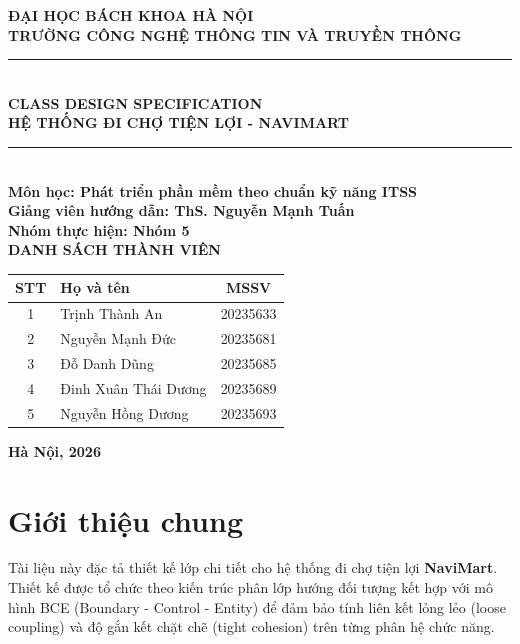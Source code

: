 \documentclass[12pt,a4paper]{article}
\begin{document}
\begin{titlepage}
    \begin{center}
        \textbf{\Large ĐẠI HỌC BÁCH KHOA HÀ NỘI} \\
        \textbf{\Large TRƯỜNG CÔNG NGHỆ THÔNG TIN VÀ TRUYỀN THÔNG} \\
        \vskip 3cm
        \noindent\rule{\textwidth}{2pt} \\
        \vskip 0.6cm
        \textbf{\Huge CLASS DESIGN SPECIFICATION} \\[0.5em]
        \textbf{\huge HỆ THỐNG ĐI CHỢ TIỆN LỢI - NAVIMART} \\
        \noindent\rule{\textwidth}{2pt} \\
        \vskip 1.5cm
        \textbf{\large Môn học: Phát triển phần mềm theo chuẩn kỹ năng ITSS} \\
        \textbf{\large Giảng viên hướng dẫn: ThS. Nguyễn Mạnh Tuấn} \\
        \textbf{\large Nhóm thực hiện: Nhóm 5} \\
        \vskip 1.5cm
        \textbf{\large DANH SÁCH THÀNH VIÊN} \\
        \vskip 0.4cm
        \begin{tabular}{|c|l|c|}
            \hline
            \textbf{STT} & \textbf{Họ và tên} & \textbf{MSSV} \\
            \hline
            1 & Trịnh Thành An & 20235633 \\
            \hline
            2 & Nguyễn Mạnh Đức & 20235681 \\
            \hline
            3 & Đỗ Danh Dũng & 20235685 \\
            \hline
            4 & Đinh Xuân Thái Dương & 20235689 \\
            \hline
            5 & Nguyễn Hồng Dương & 20235693 \\
            \hline
        \end{tabular}
        \vfill
        \textbf{Hà Nội, 2026}
    \end{center}
\end{titlepage}

\tableofcontents
\newpage

\section{Giới thiệu chung}
Tài liệu này đặc tả thiết kế lớp chi tiết cho hệ thống đi chợ tiện lợi \textbf{NaviMart}. Thiết kế được tổ chức theo kiến trúc phân lớp hướng đối tượng kết hợp với mô hình BCE (Boundary - Control - Entity) để đảm bảo tính liên kết lỏng lẻo (loose coupling) và độ gắn kết chặt chẽ (tight cohesion) trên từng phân hệ chức năng.
\end{document}
